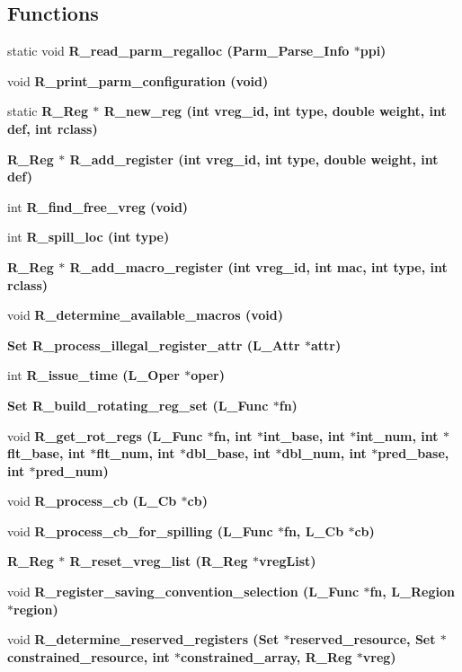 \subsection*{Functions}
\begin{CompactItemize}
\item 
static void \bf{R\_\-read\_\-parm\_\-regalloc} (\bf{Parm\_\-Parse\_\-Info} $\ast$ppi)
\item 
void \bf{R\_\-print\_\-parm\_\-configuration} (void)
\item 
static \bf{R\_\-Reg} $\ast$ \bf{R\_\-new\_\-reg} (int vreg\_\-id, int type, double weight, int def, int rclass)
\item 
\bf{R\_\-Reg} $\ast$ \bf{R\_\-add\_\-register} (int vreg\_\-id, int type, double weight, int def)
\item 
int \bf{R\_\-find\_\-free\_\-vreg} (void)
\item 
int \bf{R\_\-spill\_\-loc} (int type)
\item 
\bf{R\_\-Reg} $\ast$ \bf{R\_\-add\_\-macro\_\-register} (int vreg\_\-id, int mac, int type, int rclass)
\item 
void \bf{R\_\-determine\_\-available\_\-macros} (void)
\item 
\bf{Set} \bf{R\_\-process\_\-illegal\_\-register\_\-attr} (L\_\-Attr $\ast$attr)
\item 
int \bf{R\_\-issue\_\-time} (L\_\-Oper $\ast$oper)
\item 
\bf{Set} \bf{R\_\-build\_\-rotating\_\-reg\_\-set} (L\_\-Func $\ast$fn)
\item 
void \bf{R\_\-get\_\-rot\_\-regs} (L\_\-Func $\ast$fn, int $\ast$int\_\-base, int $\ast$int\_\-num, int $\ast$flt\_\-base, int $\ast$flt\_\-num, int $\ast$dbl\_\-base, int $\ast$dbl\_\-num, int $\ast$pred\_\-base, int $\ast$pred\_\-num)
\item 
void \bf{R\_\-process\_\-cb} (L\_\-Cb $\ast$cb)
\item 
void \bf{R\_\-process\_\-cb\_\-for\_\-spilling} (L\_\-Func $\ast$fn, L\_\-Cb $\ast$cb)
\item 
\bf{R\_\-Reg} $\ast$ \bf{R\_\-reset\_\-vreg\_\-list} (\bf{R\_\-Reg} $\ast$vreg\-List)
\item 
void \bf{R\_\-register\_\-saving\_\-convention\_\-selection} (L\_\-Func $\ast$fn, L\_\-Region $\ast$\bf{region})
\item 
void \bf{R\_\-determine\_\-reserved\_\-registers} (\bf{Set} $\ast$reserved\_\-resource, \bf{Set} $\ast$constrained\_\-resource, int $\ast$constrained\_\-array, \bf{R\_\-Reg} $\ast$vreg)
\item 

\end{CompactItemize}
